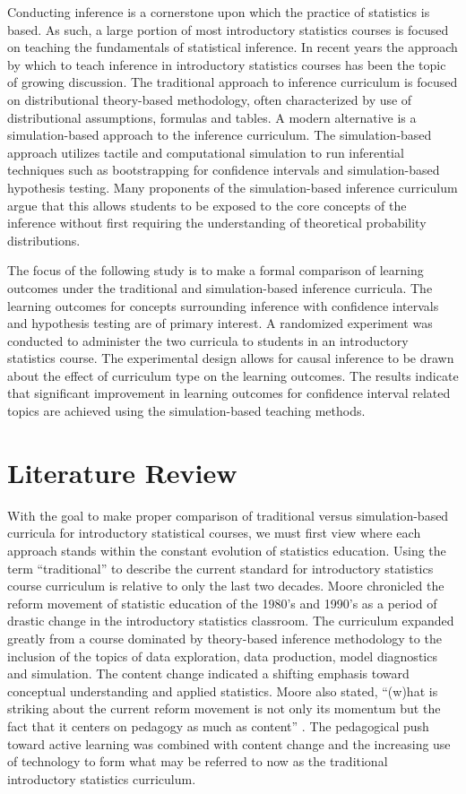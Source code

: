 \documentclass[11pt]{isuthesis}\usepackage[]{graphicx}\usepackage[]{color}
\begin{document}
Conducting inference is a cornerstone upon which the practice of statistics is based. As such, a large portion of most introductory statistics courses is focused on teaching the fundamentals of statistical inference. In recent years the approach by which to teach inference in introductory statistics courses has been the topic of growing discussion.  The traditional approach to inference curriculum is focused on distributional theory-based methodology, often characterized by use of distributional assumptions, formulas and tables. A modern alternative is a simulation-based approach to the inference curriculum. The simulation-based approach utilizes tactile and computational simulation to run inferential techniques such as bootstrapping for confidence intervals and simulation-based hypothesis testing. Many proponents of the simulation-based inference curriculum argue that this allows students to be exposed to the core concepts of the inference without first requiring the understanding of theoretical probability distributions. 

The focus of the following study is to make a formal comparison of learning outcomes under the traditional and simulation-based inference curricula.  The learning outcomes for concepts surrounding inference with confidence intervals and hypothesis testing are of primary interest.  A randomized experiment was conducted to administer the two curricula to students in an introductory statistics course. The experimental design allows for causal inference to be drawn about the effect of curriculum type on the learning outcomes. The results indicate that significant improvement in learning outcomes for confidence interval related topics are achieved using the simulation-based teaching methods.
\section{Literature Review}
\label{litreview}

With the goal to make proper comparison of traditional versus simulation-based curricula for introductory statistical courses, we must first view where each approach stands within the constant evolution of statistics education. Using the term ``traditional'' to describe the current standard for introductory statistics course curriculum is relative to only the last two decades. Moore chronicled the reform movement of statistic education of the 1980's and 1990's as a period of drastic change in the introductory statistics classroom.  The curriculum expanded greatly from a course dominated by theory-based inference methodology to the inclusion of the topics of data exploration, data production, model diagnostics and simulation.  The content change indicated a shifting emphasis toward conceptual understanding and applied statistics.  Moore also stated, ``(w)hat is striking about the current reform movement is not only its momentum but the fact that it centers on pedagogy as much as content'' \citep{Moore1997}. The pedagogical push toward active learning was combined with content change and the increasing use of technology to form what may be referred to now as the traditional introductory statistics curriculum. 
\end{document}
